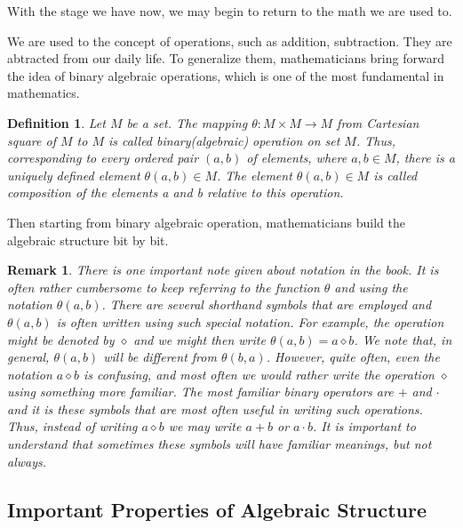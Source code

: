 \documentclass[a4paper]{article}
\newtheorem{definition}{Definition}[section]
\newtheorem{remark}{Remark}[section]
\begin{document}
	With the stage we have now, we may begin to return to the math we are
	used to.

	We are used to the concept of operations, such as addition, subtraction.
	They are abtracted from our daily life. To generalize them,
	mathematicians bring forward the idea of binary algebraic operations,
	which is one of the most fundamental in
	mathematics\cite{dixon2011algebra}.

	\begin{definition}
		Let $M$ be a set. The mapping $\theta: M \times M \rightarrow M$ from
		Cartesian square of $M$ to $M$ is called binary(algebraic) operation
		on set $M$. Thus, corresponding to every ordered pair $(a,b)$ of
		elements, where $a,b \in M$, there is a uniquely defined element
		$\theta(a,b) \in M$. The element $\theta(a,b) \in M$ is called
		composition of the elements a and b relative to this
		operation.\cite{dixon2011algebra}
	\end{definition}

	Then starting from binary algebraic operation, mathematicians build the
	algebraic structure bit by bit.

	\begin{remark}
		There is one important note given about notation in the
		book\cite{dixon2011algebra}. It is often rather cumbersome to keep
		referring to the function $\theta$ and using the notation
		$\theta(a,b)$. There are several shorthand symbols that are employed
		and $\theta(a,b)$ is often written using such special notation. For
		example, the operation might be denoted by $\diamond$ and we might
		then write $\theta(a,b) = a \diamond b$. We note that, in general,
		$\theta(a,b)$ will be different from $\theta(b,a)$. However, quite
		often, even the notation $a \diamond b$ is confusing, and most often
		we would rather write the operation $\diamond$ using something more
		familiar. The most familiar binary operators are $+$  and $\cdot$ and
		it is these symbols that are most often useful in writing such
		operations. Thus, instead of writing $a \diamond b$ we may write $a +
		b$ or $ a \cdot b$. It is important to understand that sometimes
		these symbols will have familiar meanings, but not
		always.\cite{dixon2011algebra}
	\end{remark}

	\subsection{Important Properties of Algebraic Structure}
\end{document}
